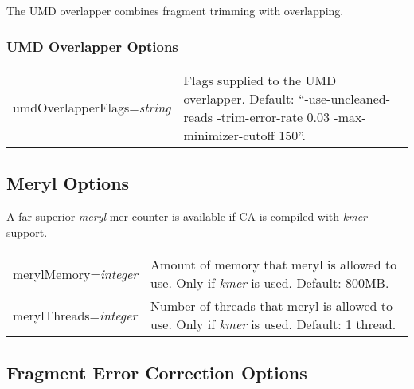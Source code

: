 \documentclass[twoside,11pt]{article}
\begin{document}
The UMD overlapper combines fragment trimming with overlapping.

\subsubsection{UMD Overlapper Options}

\begin{longtable}{lp{3.0in}}
umdOverlapperFlags={\it string} &
Flags supplied to the UMD overlapper.  Default: ``-use-uncleaned-reads -trim-error-rate 0.03 -max-minimizer-cutoff 150''.
\\
\end{longtable}

\subsection{Meryl Options}
\label{sec:merylopts}

A far superior {\em meryl} mer counter is available if CA is compiled
with {\em kmer} support.

\begin{longtable}{lp{3.0in}}
merylMemory={\it integer} &
Amount of memory that meryl is allowed to use.  Only if {\em kmer} is
used.  Default: 800MB.
\\
merylThreads={\it integer} &
Number of threads that meryl is allowed to use.  Only if {\em kmer} is
used.  Default: 1 thread.
\\
\end{longtable}



\subsection{Fragment Error Correction Options}
\label{sec:frgcorr}
\end{document}

